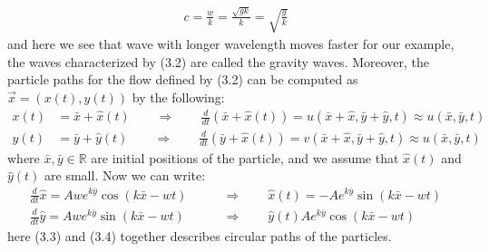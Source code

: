 \documentclass[11pt]{book}
\theoremstyle{break}
\theoremstyle{break}
\newcommand{\R}{\mathbb{R}}
\begin{document}
\begin{align*}
c = \frac{w}{k} = \frac{\sqrt{gk}}{k} = \sqrt{\frac{g}{k}}
\end{align*}
and here we see that wave with longer wavelength moves faster for our example, the waves characterized by (3.2) are called the gravity waves. Moreover, the particle paths for the flow defined by (3.2) can be computed as $\vec{x}= (x(t),y(t))$ by the following:
\begin{align*}
x(t) &= \bar{x} + \hat{x}(t) \qquad \Rightarrow \qquad \frac{d}{dt}\left( \bar{x} + \hat{x}(t) \right) = u(\bar{x}+ \hat{x}, \bar{y} + \hat{y} , t)\approx u(\bar{x}, \bar{y}, t) \\
y(t) &= \bar{y} + \hat{y}(t) \qquad \Rightarrow \qquad \frac{d}{dt}\left( \bar{y} + \hat{x}(t) \right) = v(\bar{x}+ \hat{x}, \bar{y} + \hat{y} , t)\approx u(\bar{x}, \bar{ y}, t) 
\end{align*}
where $\bar{x},\bar{y} \in \R$ are initial positions of the particle, and we assume that $\hat{x}(t)$ and $\hat{y}(t)$ are small. Now we can write:
\begin{align}
\frac{d}{dt} \hat{x} = Aw e^{k\bar{y}} \cos(k\bar{x} - wt) \qquad &\Rightarrow \qquad \hat{x}(t) = -A e^{k\bar{y}}\sin(k\bar{x}-wt)\\
\frac{d}{dt} \hat{y} = Aw e^{k\bar{y}} \sin(k\bar{x} - wt) \qquad &\Rightarrow \qquad \hat{y}(t) A e^{k\bar{y}}\cos(k\bar{x}-wt)
\end{align}
here (3.3) and (3.4) together describes circular paths of the particles. \\
\hfill\break
\end{document}
